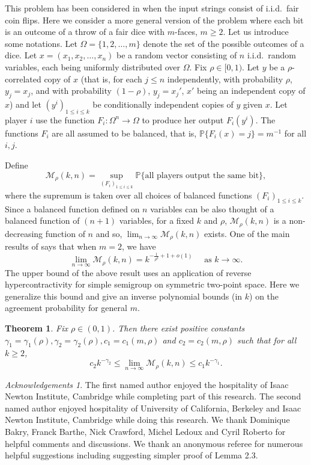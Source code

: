 \documentclass[11pt]{amsart}
\newcommand{\PP}{\mathbb{P}}
\newcommand{\1}{\mathbf{1}}
\theoremstyle{definition}
\theoremstyle{plain}
\newtheorem{theorem}[example]{Theorem}
\theoremstyle{remark}
\newtheorem*{acknowledgements}{Acknowledgements}
\numberwithin{equation}{section}
\begin{document}
 This problem has been considered in \cite{Alon91, Mossel05, Yang04, Mossel06} when the input strings consist of i.i.d.\  fair coin flips. Here we consider a more general version of the problem where each bit is an outcome of a throw  of a fair dice with $m$-faces, $m \ge 2$. Let us introduce some notations. Let  $\Omega = \{ 1, 2, \ldots, m\}$ denote the set of the possible outcomes of a dice. Let $x = (x_1, x_2, \ldots, x_n)$ be  a random vector consisting of $n$ i.i.d.\ random variables, each being uniformly distributed  over $\Omega$. Fix $\rho\in [0,  1)$. Let $y$ be a $\rho$-correlated copy of $x$ (that is, for each $j \leq n$ independently, with probability $\rho$, $y_{j}=x_{j}$, and with probability $(1-\rho)$, $y_{j}=x_{j}'$, $x'$ being an independent copy of $x$) 
and let $(y^i)_{1 \le i \le k}$ be conditionally independent copies of $y$ given $x$.  Let player $i$ use the function $F_i : \Omega^n \to \Omega$ to produce her output  $F_i(y^i)$.  The functions $F_i$ are all assumed to be balanced, that is, $ \PP\{F_i(x) = j\} = m^{-1}$ for all $i, j$.

Define
\[ \mathcal {M}_\rho(k, n) = \sup_{ (F_i)_{1 \le i \le k}} \PP\{ \text{all players output the same bit} \}, \]
 where the supremum is taken over all choices of balanced functions $ (F_i)_{1 \le i \le k}$. Since a balanced function defined on $n$  variables can be also thought of a balanced function of $(n+1)$ variables, for a fixed $k$ and $\rho$, $\mathcal {M}_\rho(k, n)$ is a non-decreasing function of $n$ and so, $\lim_{n \to \infty } \mathcal{M}_\rho(k, n)$ exists.  One of the main results of \cite{Mossel06} says that when $m = 2$, we have
 \[ \lim_{n \to \infty } \mathcal{M}_\rho(k, n) = k^{ - \frac{1}{\rho^2} +1 +o(1)} \quad \text{ as } k \to \infty. \]
 The upper bound of the above result uses an application of reverse hypercontractivity for simple semigroup on symmetric two-point space.  Here we generalize this bound and give an  inverse polynomial bounds (in $k$) on the agreement probability  for general $m$.
\begin{theorem} \label{thm:nicd}
Fix $\rho \in (0, 1)$. Then there exist positive constants $\gamma_1=\gamma_1(\rho),\gamma_2 = \gamma_2(\rho), c_1 = c_1(m,\rho)$ and $c_2=c_2(m,\rho)$ such that for all $k \ge 2$,
\[ c_2 k^{  - \gamma_2} \le \lim_{n \to \infty } \mathcal{M}_\rho(k, n) \le c_1k^{-\gamma_1}.\]
\end{theorem}

\begin{acknowledgements}
The first named author enjoyed the hospitality of Isaac Newton Institute, Cambridge while completing part of  this research.
The second named author enjoyed hospitality of University of California, Berkeley and Isaac Newton Institute, Cambridge while doing this research.
We thank Dominique Bakry, Franck Barthe, Nick Crawford, Michel Ledoux and Cyril Roberto for helpful comments and discussions. We thank an anonymous referee for numerous helpful suggestions including suggesting simpler proof of Lemma 2.3. 
\end{acknowledgements}
\end{document}
